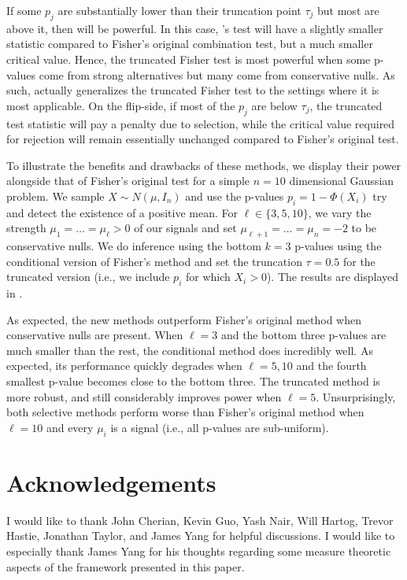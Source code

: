 \documentclass{article}
\begin{document}
If some $p_j$ are substantially lower than their truncation point $\tau_j$ but most are above it, then  will be powerful. In this case, 's test will have a slightly smaller statistic compared to Fisher's original combination test, but a much smaller critical value. Hence, the truncated Fisher test is most powerful when some p-values come from strong alternatives but many come from conservative nulls. As such,  actually generalizes the truncated Fisher test to the settings where it is most applicable. On the flip-side, if most of the $p_j$ are below $\tau_j$, the truncated test statistic will pay a penalty due to selection, while the critical value required for rejection will remain essentially unchanged compared to Fisher's original test. 

To illustrate the benefits and drawbacks of these methods, we display their power alongside that of Fisher's original test for a simple $n=10$ dimensional Gaussian problem. We sample $X \sim N(\mu, I_n)$ and use the p-values $p_i = 1 - \Phi(X_i)$ try and detect the existence of a positive mean. For $\ell \in \{3, 5, 10\}$, we vary the strength $\mu_1 = \dots = \mu_{\ell} > 0$ of our signals and set $\mu_{\ell + 1} = \dots = \mu_n = -2$ to be conservative nulls. We do inference using the bottom $k=3$ p-values using the conditional version of Fisher's method and set the truncation $\tau = 0.5$ for the truncated version (i.e., we include $p_i$ for which $X_i > 0$). The results are displayed in .

As expected, the new methods outperform Fisher's original method when conservative nulls are present. When $\ell=3$ and the bottom three p-values are much smaller than the rest, the conditional method does incredibly well. As expected, its  performance quickly degrades when $\ell = 5, 10$ and the fourth smallest p-value becomes close to the bottom three. The truncated method is more robust, and still considerably improves power when $\ell=5$. Unsurprisingly, both selective methods perform worse than Fisher's original method when $\ell=10$ and every $\mu_i$ is a signal (i.e., all p-values are sub-uniform). 


\section*{Acknowledgements}
I would like to thank John Cherian, Kevin Guo, Yash Nair, Will Hartog, Trevor Hastie, Jonathan Taylor, and James Yang for helpful discussions. I would like to especially thank James Yang for his thoughts regarding some measure theoretic aspects of the framework presented in this paper.
\end{document}
